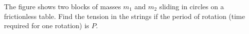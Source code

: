 The figure shows two blocks of masses $m_1$ and $m_2$
sliding in circles on a frictionless table. Find the tension
in the strings if the period of rotation (time required for
one rotation) is $P$.\answercheck
